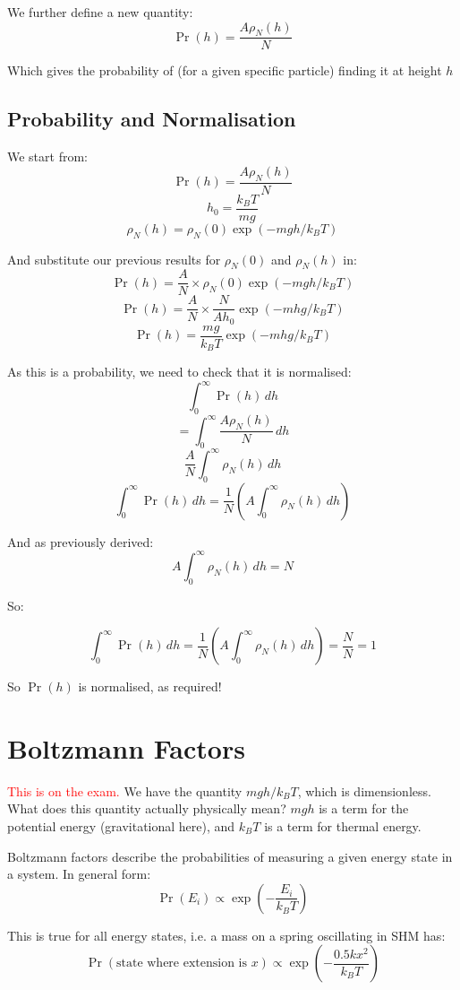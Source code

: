 We further define a new quantity:
\[
    \Pr(h) = \frac{A \rho_N(h)}{N}
\]

Which gives the probability of (for a given specific particle) finding it at height $h$

\subsection{Probability and Normalisation}
We start from:
\[
    \Pr(h) = \frac{A \rho_N(h)}{N}
\]
\[
    h_0 = \frac{k_B T}{mg}
\]
\[
    \rho_N(h) = \rho_N(0) \exp(-mgh / k_B T)
\]

And substitute our previous results for $\rho_N(0)$ and $\rho_N(h)$ in:
\[
    \Pr(h) = \frac{A}{N} \times \rho_N(0) \exp(-mgh / k_B T)
\]
\[
    \Pr(h) = \frac{A}{N} \times \frac{N}{A h_0} \exp(-mhg / k_B T)
\]
\[
    \Pr(h) = \frac{mg}{k_B T} \exp(-mhg / k_B T)
\]

As this is a probability, we need to check that it is normalised:
\[
    \int_{0}^{\infty} \Pr(h) \, dh
\]
\[
    = \int_{0}^{\infty} \frac{A \rho_N(h)}{N} \, dh
\]
\[
    \frac{A}{N}\int_{0}^{\infty} \rho_N(h) \, dh
\]
\[
    \int_{0}^{\infty} \Pr(h) \, dh = \frac{1}{N} \left(A \int_{0}^{\infty} \rho_N(h) \, dh \right)
\]

And as previously derived:
\[
    A \int_{0}^{\infty} \rho_N(h) \, dh = N
\]

So:

\[
        \int_{0}^{\infty} \Pr(h) \, dh = \frac{1}{N} \left(A \int_{0}^{\infty} \rho_N(h) \, dh \right) = \frac{N}{N} = 1
\]

So $\Pr(h)$ is normalised, as required!

\section{Boltzmann Factors}
\textcolor{red}{This is on the exam.} We have the quantity $mgh / k_B T$, which is dimensionless. What does this quantity actually physically mean? $mgh$ is a term for the potential energy (gravitational here), and $k_B T$ is a term for thermal energy.

Boltzmann factors describe the probabilities of measuring a given energy state in a system. In general form:
\[
    \Pr(E_i) \propto \exp \left(-\frac{E_i}{k_B T}\right)
\]

This is true for all energy states, i.e. a mass on a spring oscillating in SHM has:
\[
    \Pr(\text{state where extension is } x) \propto \exp \left(-\frac{0.5kx^2}{k_B T}\right)
\]

